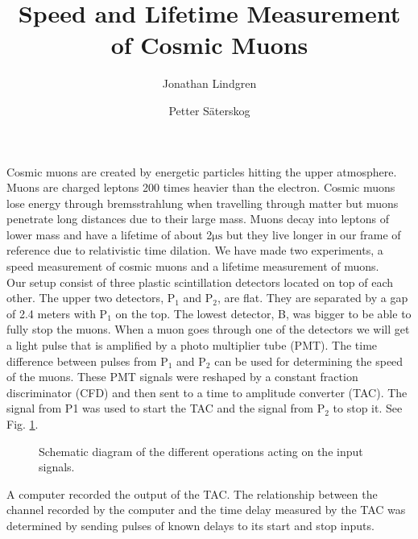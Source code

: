 \documentclass[10pt,twocolumn]{article}
\title{Speed and Lifetime Measurement of Cosmic Muons}
\author{Jonathan Lindgren \and Petter Säterskog}
\begin{document}
Cosmic muons are created by energetic particles hitting the upper atmosphere. Muons are charged leptons 200 times heavier than the electron. Cosmic muons lose energy through bremsstrahlung when travelling through matter but muons penetrate long distances due to their large mass\cite{PhysRevD.45.3051}. Muons decay into leptons of lower mass and have a lifetime of about 2$\mathrm{\mu s}$ but they live longer in our frame of reference due to relativistic time dilation\cite{frisch:342}. We have made two experiments, a speed measurement of cosmic muons and a lifetime measurement of muons.\\
Our setup consist of three plastic scintillation detectors located on top of each other. The upper two detectors, P$_1$ and P$_2$, are flat. They are separated by a gap of 2.4 meters with P$_1$ on the top. The lowest detector, B, was bigger to be able to fully stop the muons. When a muon goes through one of the detectors we will get a light pulse that is amplified by a photo multiplier tube (PMT). The time difference between pulses from P$_1$ and P$_2$ can be used for determining the speed of the muons. These PMT signals were reshaped by a constant fraction discriminator (CFD) and then sent to a time to amplitude converter (TAC). The signal from P1 was used to start the TAC and the signal from P$_2$ to stop it. See Fig. \ref{setup}.
\begin{figure}[h]

\caption{\label{setup} Schematic diagram of the different operations acting on the input signals.}
\end{figure}
A computer recorded the output of the TAC. The relationship between the channel recorded by the computer and the time delay measured by the TAC was determined by sending pulses of known delays to its start and stop inputs.\\  %
\end{document}
